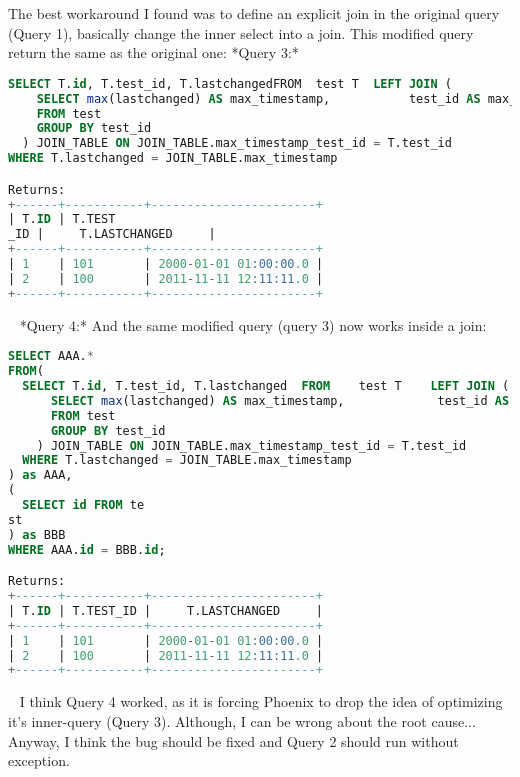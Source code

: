 \documentclass{report}%
\begin{document}
The best workaround I found was to define an explicit join in the original query (Query 1), basically change the inner select into a join. This modified query return the same as the original one:\newline%
\newline%
\newline%
*Query 3:*\newline%
\begin{lstlisting}[language=sql]
SELECT T.id, T.test_id, T.lastchangedFROM  test T  LEFT JOIN (
    SELECT max(lastchanged) AS max_timestamp,           test_id AS max_timestamp_test_id
    FROM test
    GROUP BY test_id
  ) JOIN_TABLE ON JOIN_TABLE.max_timestamp_test_id = T.test_id
WHERE T.lastchanged = JOIN_TABLE.max_timestamp

Returns:
+------+-----------+-----------------------+
| T.ID | T.TEST
_ID |     T.LASTCHANGED     |
+------+-----------+-----------------------+
| 1    | 101       | 2000-01-01 01:00:00.0 |
| 2    | 100       | 2011-11-11 12:11:11.0 |
+------+-----------+-----------------------+
\end{lstlisting} \ \newline%
*Query 4:* And the same modified query (query 3) now works inside a join:\newline%
\begin{lstlisting}[language=sql]
SELECT AAA.*
FROM(
  SELECT T.id, T.test_id, T.lastchanged  FROM    test T    LEFT JOIN (
      SELECT max(lastchanged) AS max_timestamp,             test_id AS max_timestamp_test_id
      FROM test
      GROUP BY test_id
    ) JOIN_TABLE ON JOIN_TABLE.max_timestamp_test_id = T.test_id
  WHERE T.lastchanged = JOIN_TABLE.max_timestamp
) as AAA,
(
  SELECT id FROM te
st
) as BBB
WHERE AAA.id = BBB.id;

Returns:
+------+-----------+-----------------------+
| T.ID | T.TEST_ID |     T.LASTCHANGED     |
+------+-----------+-----------------------+
| 1    | 101       | 2000-01-01 01:00:00.0 |
| 2    | 100       | 2011-11-11 12:11:11.0 |
+------+-----------+-----------------------+
\end{lstlisting} \ \newline%
\newline%
I think Query 4 worked, as it is forcing Phoenix to drop the idea of optimizing it's inner{-}query (Query 3). Although, I can be wrong about the root cause...\newline%
\newline%
Anyway, I think the bug should be fixed and Query 2 should run without exception.
\end{document}
